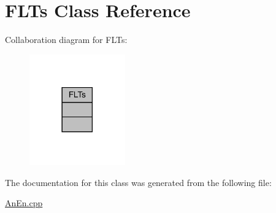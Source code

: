 \hypertarget{class_f_l_ts}{}\section{F\+L\+Ts Class Reference}
\label{class_f_l_ts}


Collaboration diagram for F\+L\+Ts\+:
\nopagebreak
\begin{figure}[H]
\begin{center}
\leavevmode
\includegraphics[width=117pt]{class_f_l_ts__coll__graph}
\end{center}
\end{figure}


The documentation for this class was generated from the following file\+:\begin{DoxyCompactItemize}
\item 
\mbox{\hyperlink{_an_en_8cpp}{An\+En.\+cpp}}\end{DoxyCompactItemize}
